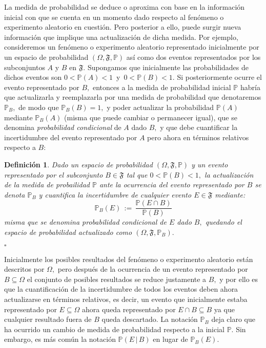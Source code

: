 \documentclass[spanish,10pt,letterpaper]{article}
\newtheorem{defi}{Definición}
\newcommand{\prob}{\mathbb{P}}
\newcommand{\qed}{\begin{flushright}$\square$\end{flushright}}
\begin{document}
	
	La medida de probabilidad se deduce o aproxima con base en la información inicial con que se cuenta en un momento dado respecto al fenómeno o experimento aleatorio en cuestión. Pero posterior a ello, puede surgir nueva información que implique una actualización de dicha medida. Por ejemplo, consideremos un fenómeno o experimento aleatorio representado inicialmente por un espacio de probabilidad $(\Omega,\mathfrak{F},\prob)$ así como dos eventos representados por los subconjuntos $A$ y $B$ en  $\mathfrak{F}.$ Supongamos que inicialmente las probabilidades de dichos eventos son $0<\prob(A)<1\,$ y $\,0<\prob(B)<1.$ Si posteriormente ocurre el evento representado por $B,$ entonces a la medida de probabilidad inicial $\prob$ habría que actualizarla y reemplazarla por una medida de probabilidad que denotaremos $\prob_B,$ de modo que $\prob_B(B)=1,$ y poder actualizar la probabilidad $\prob(A)$ mediante $\prob_B(A)$ (misma que puede cambiar o permanecer igual), que se denomina \textit{probabilidad condicional} de $A$ dado $B,$ y que debe cuantificar la incertidumbre del evento representado por $A$ pero ahora en términos relativos respecto a $B:$
	
	\medskip 
	
	\begin{defi}\label{def:probacond}
		Dado un espacio de probabilidad $(\Omega,\mathfrak{F},\prob)$ y un evento representado por el subconjunto $B\in\mathfrak{F}$ tal que $0<\prob(B)<1,$ la actualización de la medida de probailidad $\prob$ ante la ocurrencia del evento representado por $B$ se denota $\prob_B$ y cuantifica la incertidumbre de cualquier evento $E\in\mathfrak{F}$ mediante: $$\prob_B(E) \,:=\, \frac{\prob(E\cap B)}{\prob(B)}$$ misma que se denomina probabilidad condicional de $E$ dado $B,$ quedando el espacio de probabilidad actualizado como $(\Omega,\mathfrak{F},\prob_B).$ \qed 		
	\end{defi}
	
	Inicialmente los posibles resultados del fenómeno o experimento aleatorio están descritos por $\Omega,$ pero después de la ocurrencia de un evento representado por $B\subseteq\Omega$ el conjunto de posibles resultados se reduce justamente a $B,$ y por ello es que la cuantificación de la incertidumbre de todos los eventos deben ahora actualizarse en términos relativos, es decir, un evento que inicialmente estaba representado por $E\subseteq\Omega$ ahora queda representado por $E\cap B\subseteq B$ ya que cualquier resultado fuera de $B$ queda descartado. La notación $\prob_B$ deja claro que ha ocurrido un cambio de medida de probabilidad respecto a la inicial $\prob.$ Sin embargo, es más común la notación $\prob(E\,|\,B)$ en lugar de $\prob_B(E).$
	
\end{document}
